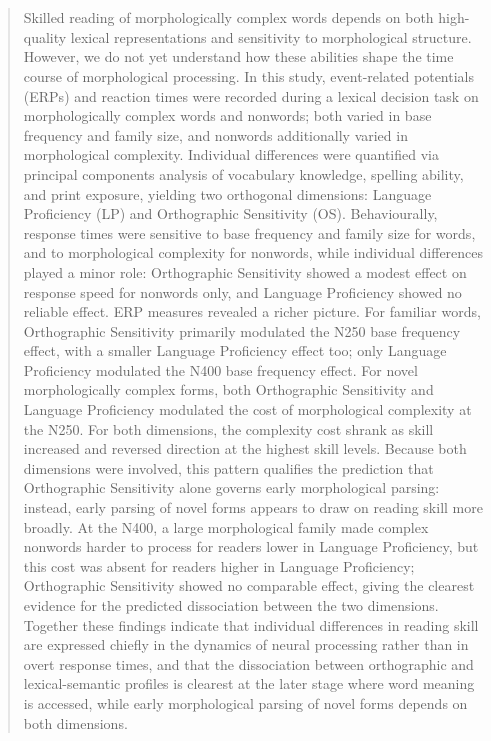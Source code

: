 \documentclass[utf8]{FrontiersinHarvard} %
\begin{document}
	
\begin{abstract}
		
	\section{}
	Skilled reading of morphologically complex words depends on both high-quality lexical representations and sensitivity to morphological structure. However, we do not yet understand how these abilities shape the time course of morphological processing. In this study, event-related potentials (ERPs) and reaction times were recorded during a lexical decision task on morphologically complex words and nonwords; both varied in base frequency and family size, and nonwords additionally varied in morphological complexity. Individual differences were quantified via principal components analysis of vocabulary knowledge, spelling ability, and print exposure, yielding two orthogonal dimensions: Language Proficiency (LP) and Orthographic Sensitivity (OS). Behaviourally, response times were sensitive to base frequency and family size for words, and to morphological complexity for nonwords, while individual differences played a minor role: Orthographic Sensitivity showed a modest effect on response speed for nonwords only, and Language Proficiency showed no reliable effect. ERP measures revealed a richer picture. For familiar words, Orthographic Sensitivity primarily modulated the N250 base frequency effect, with a smaller Language Proficiency effect too; only Language Proficiency modulated the N400 base frequency effect. For novel morphologically complex forms, both Orthographic Sensitivity and Language Proficiency modulated the cost of morphological complexity at the N250. For both dimensions, the complexity cost shrank as skill increased and reversed direction at the highest skill levels. Because both dimensions were involved, this pattern qualifies the prediction that Orthographic Sensitivity alone governs early morphological parsing: instead, early parsing of novel forms appears to draw on reading skill more broadly. At the N400, a large morphological family made complex nonwords harder to process for readers lower in Language Proficiency, but this cost was absent for readers higher in Language Proficiency; Orthographic Sensitivity showed no comparable effect, giving the clearest evidence for the predicted dissociation between the two dimensions. Together these findings indicate that individual differences in reading skill are expressed chiefly in the dynamics of neural processing rather than in overt response times, and that the dissociation between orthographic and lexical-semantic profiles is clearest at the later stage where word meaning is accessed, while early morphological parsing of novel forms depends on both dimensions.
		

\end{abstract}
\end{document}

